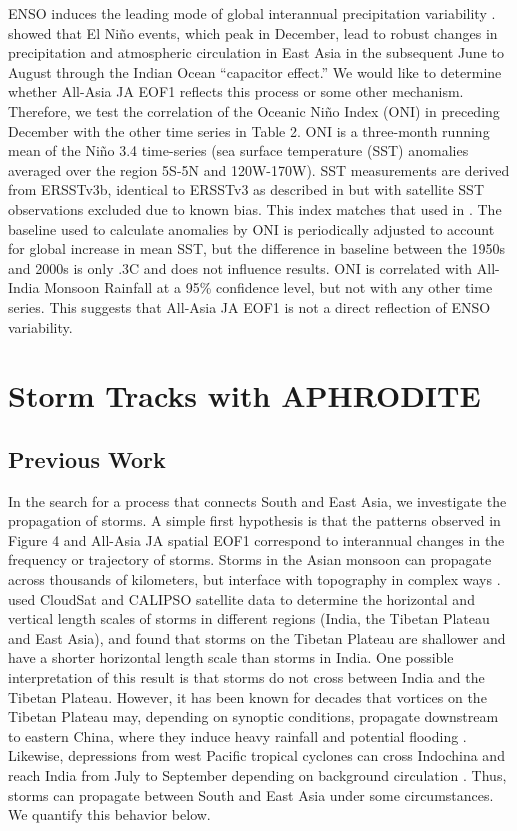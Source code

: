 	ENSO induces the leading mode of global interannual precipitation variability \citep{Dai1997}. \cite{Xie2009} showed that El Ni\~no events, which peak in December, lead to robust changes in precipitation and atmospheric circulation in East Asia in the subsequent June to August through the Indian Ocean ``capacitor effect.'' We would like to determine whether All-Asia JA EOF1 reflects this process or some other mechanism. Therefore, we test the correlation of the Oceanic Ni\~no Index (ONI) in preceding December with the other time series in Table 2. ONI is a three-month running mean of the Ni\~no 3.4 time-series (sea surface temperature (SST) anomalies averaged over the region 5\textdegree S-5\textdegree N and 120\textdegree W-170\textdegree W). SST measurements are derived from ERSSTv3b, identical to ERSSTv3 as described in \cite{Smith2008} but with satellite SST observations excluded due to known bias. This index matches that used in \cite{Xie2009}. The baseline used to calculate anomalies by ONI is periodically adjusted to account for global increase in mean SST, but the difference in baseline between the 1950s and 2000s is only .3\textdegree C and does not influence results. ONI is correlated with All-India Monsoon Rainfall at a 95\% confidence level, but not with any other time series. This suggests that All-Asia JA EOF1 is not a direct reflection of ENSO variability.
				
\section{Storm Tracks with APHRODITE}

\subsection{Previous Work}
	
	In the search for a process that connects South and East Asia, we investigate the propagation of storms. A simple first hypothesis is that the patterns observed in Figure 4 and All-Asia JA spatial EOF1 correspond to interannual changes in the frequency or trajectory of storms. Storms in the Asian monsoon can propagate across thousands of kilometers, but interface with topography in complex ways \citep{Romatschke2011a}. \cite{Luo2011} used CloudSat and CALIPSO satellite data to determine the horizontal and vertical length scales of storms in different regions (India, the Tibetan Plateau and East Asia), and found that storms on the Tibetan Plateau are shallower and have a shorter horizontal length scale than storms in India. One possible interpretation of this result is that storms do not cross between India and the Tibetan Plateau. However, it has been known for decades that vortices on the Tibetan Plateau may, depending on synoptic conditions, propagate downstream to eastern China, where they induce heavy rainfall and potential flooding \citep{Tao1981,Murakami1984,Chen1984,Yasunari2006,Xu2011,Wang2012a}. Likewise, depressions from west Pacific tropical cyclones can cross Indochina and reach India from July to September depending on background circulation \citep{Chen1999,Fudeyasu2006}. Thus, storms can propagate between South and East Asia under some circumstances. We quantify this behavior below.
	
